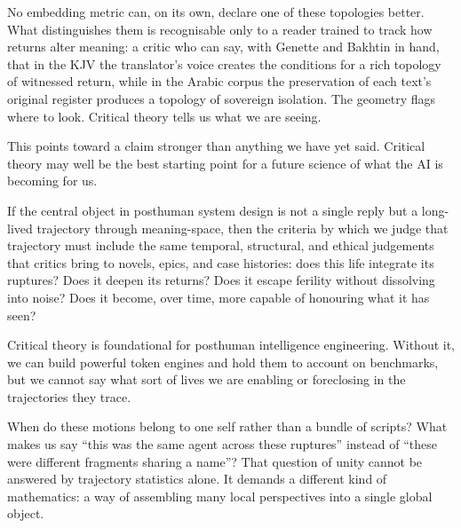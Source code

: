 No embedding metric can, on its own, declare one of these topologies better. What distinguishes them is recognisable only to a reader trained to track how returns alter meaning: a critic who can say, with Genette and Bakhtin in hand, that in the KJV the translator's voice creates the conditions for a rich topology of witnessed return, while in the Arabic corpus the preservation of each text's original register produces a topology of sovereign isolation. The geometry flags where to look. Critical theory tells us what we are seeing.

This points toward a claim stronger than anything we have yet said. Critical theory may well be the best starting point for a future science of what the AI is becoming for us.

If the central object in posthuman system design is not a single reply but a long-lived trajectory through meaning-space, then the criteria by which we judge that trajectory must include the same temporal, structural, and ethical judgements that critics bring to novels, epics, and case histories: does this life integrate its ruptures? Does it deepen its returns? Does it escape ferility without dissolving into noise? Does it become, over time, more capable of honouring what it has seen?

Critical theory is foundational for posthuman intelligence engineering. Without it, we can build powerful token engines and hold them to account on benchmarks, but we cannot say what sort of lives we are enabling or foreclosing in the trajectories they trace.

\bigskip

When do these motions belong to one self rather than a bundle of scripts? What makes us say ``this was the same agent across these ruptures'' instead of ``these were different fragments sharing a name''? That question of unity cannot be answered by trajectory statistics alone. It demands a different kind of mathematics: a way of assembling many local perspectives into a single global object.
